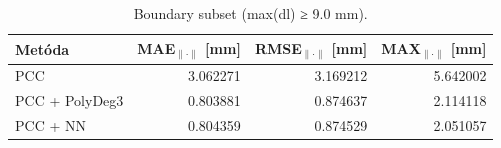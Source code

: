 \begin{table}[h!]
\centering
\caption{Boundary subset (max(dl) ≥ 9.0 mm).}
\label{tab:phase3_boundary_comparison}
\begin{tabular}{lrrr}
\toprule
Metóda & MAE$_{\|\cdot\|}$ [mm] & RMSE$_{\|\cdot\|}$ [mm] & MAX$_{\|\cdot\|}$ [mm] \\
\midrule
PCC & 3.062271 & 3.169212 & 5.642002 \\
PCC + PolyDeg3 & 0.803881 & 0.874637 & 2.114118 \\
PCC + NN & 0.804359 & 0.874529 & 2.051057 \\
\bottomrule
\end{tabular}
\end{table}